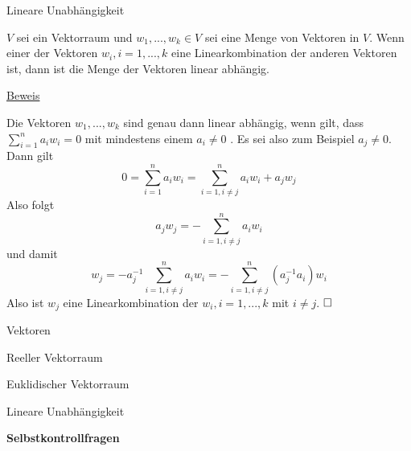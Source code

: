 \documentclass[
  8pt,
  ignorenonframetext,
]{beamer}
\begin{document}
\begin{frame}{Lineare Unabhängigkeit}
\protect\hypertarget{lineare-unabhuxe4ngigkeit-4}{}
\vspace{3mm}
\small
\begin{theorem}
\justifying
\normalfont
$V$ sei ein Vektorraum und $w_1,...,w_k \in V$ sei eine Menge von Vektoren in $V$.
Wenn einer der Vektoren $w_i, i = 1,...,k$ eine Linearkombination der anderen
Vektoren ist, dann ist die Menge der Vektoren linear abhängig.
\end{theorem}

\footnotesize

\underline{Beweis}

Die Vektoren \(w_1,...,w_k\) sind genau dann linear abhängig, wenn gilt,
dass \(\sum_{i=1}^n a_i w_i = 0\) mit mindestens einem \(a_i \neq 0\) .
Es sei also zum Beispiel \(a_j \neq 0\). Dann gilt \begin{equation}
0 = \sum_{i=1}^n a_i w_i = \sum_{i=1, i \neq j}^n a_i w_i + a_jw_j
\end{equation} Also folgt \begin{equation}
a_jw_j  = - \sum_{i=1, i \neq j}^n a_i w_i
\end{equation} und damit \begin{equation}
w_j  = - a_j^{-1}\sum_{i=1, i \neq j}^n a_i w_i = - \sum_{i=1, i \neq j}^n (a_j^{-1}a_i) w_i
\end{equation} Also ist \(w_j\) eine Linearkombination der
\(w_i, i = 1,...,k\) mit \(i \neq j\). \(\hfill \Box\)
\end{frame}

\begin{frame}{Vektoren}
\protect\hypertarget{vektoren-5}{}
\vfill
{}
\Large

Reeller Vektorraum

Euklidischer Vektorraum

Lineare Unabhängigkeit

\textbf{Selbstkontrollfragen}
\end{frame}
\end{document}
